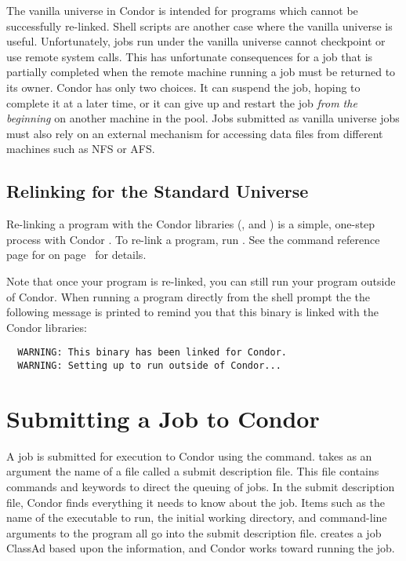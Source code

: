 The vanilla universe in Condor is intended
for programs which cannot
be successfully re-linked.
Shell scripts are another case where the vanilla universe
is useful.
Unfortunately, jobs run under the vanilla universe cannot checkpoint or use
remote system calls. 
This has unfortunate consequences for a job that is partially
completed 
when the remote machine running a job must be returned
to its owner.
Condor has only two choices.  It can suspend the job, hoping to
complete it at a later time,
or it can give up and restart the job \emph{from the beginning} 
on another machine in the pool.
Jobs submitted as vanilla universe jobs must also rely on an
external mechanism 
for accessing data files from different machines
such as NFS or AFS.

\subsection{Relinking for the Standard Universe}

Re-linking a program with the Condor libraries (,
 and ) is a
simple, one-step process with Condor \VersionNotice.
To re-link a program, run . 
See the command reference page for  on
page~\pageref{man-condor-compile} for details.

Note that once your program is re-linked, you can still run your program
outside of Condor. When running a program directly from the shell prompt
the the following message is printed to remind you that this 
binary is linked with the Condor libraries:
\begin{verbatim}
  WARNING: This binary has been linked for Condor.
  WARNING: Setting up to run outside of Condor...
\end{verbatim}

\section{Submitting a Job to Condor}

A job is submitted for execution to Condor using the
 command.
 takes as an argument the name of a
file called a submit description file.
This file contains commands and keywords to direct the queuing of jobs.
In the submit description file, Condor finds everything it needs
to know about the job.  Items such as the name of the executable to run,
the initial working directory, and command-line arguments to the
program all go into
the submit description file.   creates a job
ClassAd based upon the information,
and Condor
works toward running the job.

